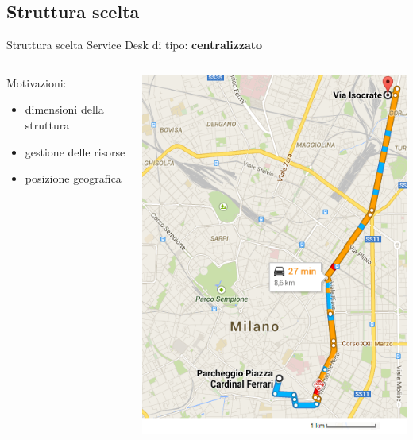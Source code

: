 \subsection{Struttura scelta}
\begin{frame}{Struttura scelta}
Service Desk di tipo: \textbf{centralizzato}\\
\begin{columns}
\begin{column}{0.6\textwidth}
Motivazioni:
\begin{itemize}
\item{dimensioni della struttura}
\item{gestione delle risorse}
\item{posizione geografica}
\end{itemize}
\end{column}
\begin{column}{0.4\textwidth}
\hspace{10mm}
\centering
\includegraphics[scale=0.4]{Images/Maps.png}
\end{column}
\end{columns}
\end{frame}

